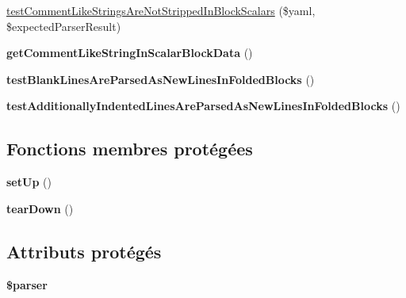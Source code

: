 \begin{DoxyCompactItemize}
\item 
\hyperlink{class_symfony_1_1_component_1_1_yaml_1_1_tests_1_1_parser_test_a3943d0e9257d1906a4a72610e1a28a45}{test\+Comment\+Like\+Strings\+Are\+Not\+Stripped\+In\+Block\+Scalars} (\$yaml, \$expected\+Parser\+Result)
\item 
{\bfseries get\+Comment\+Like\+String\+In\+Scalar\+Block\+Data} ()\hypertarget{class_symfony_1_1_component_1_1_yaml_1_1_tests_1_1_parser_test_aaf62a54c36c5c818621ab0c9fc3c6174}{}\label{class_symfony_1_1_component_1_1_yaml_1_1_tests_1_1_parser_test_aaf62a54c36c5c818621ab0c9fc3c6174}

\item 
{\bfseries test\+Blank\+Lines\+Are\+Parsed\+As\+New\+Lines\+In\+Folded\+Blocks} ()\hypertarget{class_symfony_1_1_component_1_1_yaml_1_1_tests_1_1_parser_test_a467f71688ece166e57df91bc2fd578ad}{}\label{class_symfony_1_1_component_1_1_yaml_1_1_tests_1_1_parser_test_a467f71688ece166e57df91bc2fd578ad}

\item 
{\bfseries test\+Additionally\+Indented\+Lines\+Are\+Parsed\+As\+New\+Lines\+In\+Folded\+Blocks} ()\hypertarget{class_symfony_1_1_component_1_1_yaml_1_1_tests_1_1_parser_test_a775d28798b98219cc742ebcf50311279}{}\label{class_symfony_1_1_component_1_1_yaml_1_1_tests_1_1_parser_test_a775d28798b98219cc742ebcf50311279}

\end{DoxyCompactItemize}
\subsection*{Fonctions membres protégées}
\begin{DoxyCompactItemize}
\item 
{\bfseries set\+Up} ()\hypertarget{class_symfony_1_1_component_1_1_yaml_1_1_tests_1_1_parser_test_a0bc688732d2b3b162ffebaf7812e78da}{}\label{class_symfony_1_1_component_1_1_yaml_1_1_tests_1_1_parser_test_a0bc688732d2b3b162ffebaf7812e78da}

\item 
{\bfseries tear\+Down} ()\hypertarget{class_symfony_1_1_component_1_1_yaml_1_1_tests_1_1_parser_test_a80fe3d17e658907fc75346a0ec9d6fc7}{}\label{class_symfony_1_1_component_1_1_yaml_1_1_tests_1_1_parser_test_a80fe3d17e658907fc75346a0ec9d6fc7}

\end{DoxyCompactItemize}
\subsection*{Attributs protégés}
\begin{DoxyCompactItemize}
\item 
{\bfseries \$parser}\hypertarget{class_symfony_1_1_component_1_1_yaml_1_1_tests_1_1_parser_test_a147a766daa03d52576c7345fea31c945}{}\label{class_symfony_1_1_component_1_1_yaml_1_1_tests_1_1_parser_test_a147a766daa03d52576c7345fea31c945}

\end{DoxyCompactItemize}


